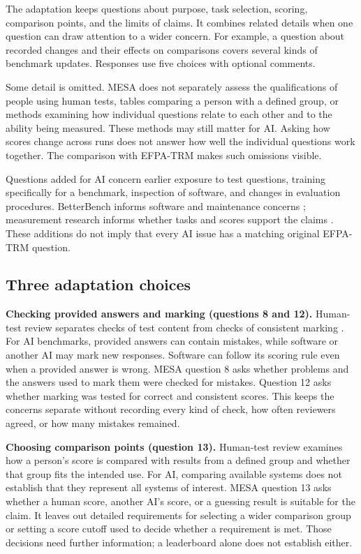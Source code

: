 \documentclass[10pt,conference]{IEEEtran}
\begin{document}
The adaptation keeps questions about purpose, task selection, scoring, comparison points, and the limits of claims. It combines related details when one question can draw attention to a wider concern. For example, a question about recorded changes and their effects on comparisons covers several kinds of benchmark updates. Responses use five choices with optional comments.

Some detail is omitted. MESA does not separately assess the qualifications of people using human tests, tables comparing a person with a defined group, or methods examining how individual questions relate to each other and to the ability being measured. These methods may still matter for AI. Asking how scores change across runs does not answer how well the individual questions work together. The comparison with EFPA-TRM makes such omissions visible.

Questions added for AI concern earlier exposure to test questions, training specifically for a benchmark, inspection of software, and changes in evaluation procedures. BetterBench informs software and maintenance concerns \cite{reuel_betterbench}; measurement research informs whether tasks and scores support the claims \cite{bean_measuring_what_matters}. These additions do not imply that every AI issue has a matching original EFPA-TRM question.

\subsection{Three adaptation choices}
\textbf{Checking provided answers and marking (questions 8 and 12).} Human-test review separates checks of test content from checks of consistent marking \cite{efpa_test_review_model_2025}. For AI benchmarks, provided answers can contain mistakes, while software or another AI may mark new responses. Software can follow its scoring rule even when a provided answer is wrong. MESA question 8 asks whether problems and the answers used to mark them were checked for mistakes. Question 12 asks whether marking was tested for correct and consistent scores. This keeps the concerns separate without recording every kind of check, how often reviewers agreed, or how many mistakes remained.

\textbf{Choosing comparison points (question 13).} Human-test review examines how a person's score is compared with results from a defined group and whether that group fits the intended use. For AI, comparing available systems does not establish that they represent all systems of interest. MESA question 13 asks whether a human score, another AI's score, or a guessing result is suitable for the claim. It leaves out detailed requirements for selecting a wider comparison group or setting a score cutoff used to decide whether a requirement is met. Those decisions need further information; a leaderboard alone does not establish either.
\end{document}
